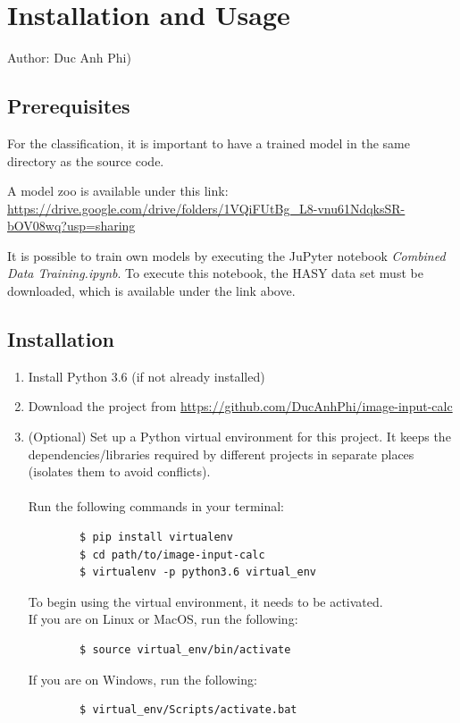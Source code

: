\documentclass[12pt]{article}
\begin{document}
	\section{Installation and Usage}
	\small{Author: Duc Anh Phi)\\
	\subsection{Prerequisites}
	For the classification, it is important to have a trained model in the same directory as the source code.
	
	A model zoo is available under this link: \\
	\url{https://drive.google.com/drive/folders/1VQiFUtBg_L8-vnu61NdqksSR-bOV08wq?usp=sharing}
	
	It is possible to train own models by executing the JuPyter notebook \textit{Combined Data Training.ipynb}. To execute this notebook, the HASY data set must be downloaded, which is available under the link above.
	\subsection{Installation}
	\begin{enumerate}
		\item Install Python 3.6 (if not already installed)
		\item Download the project from \url{https://github.com/DucAnhPhi/image-input-calc}
		\item (Optional) Set up a Python virtual environment for this project. It keeps the dependencies/libraries required by different projects in separate places (isolates them to avoid conflicts). \\
		\\
		Run the following commands in your terminal:
		\begin{verbatim}
		$ pip install virtualenv
		$ cd path/to/image-input-calc
		$ virtualenv -p python3.6 virtual_env
		\end{verbatim}
		To begin using the virtual environment, it needs to be activated.
		\\
		If you are on Linux or MacOS, run the following:

		\begin{verbatim}
		$ source virtual_env/bin/activate
		\end{verbatim}

		If you are on Windows, run the following:

		\begin{verbatim}
		$ virtual_env/Scripts/activate.bat
		\end{verbatim}


\end{enumerate}}
\end{document}
